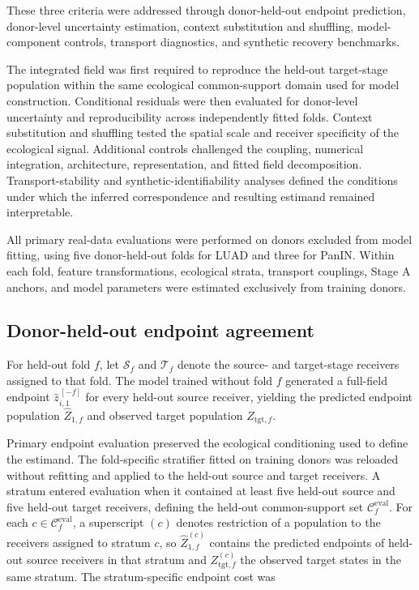 These three criteria were addressed through donor-held-out endpoint
prediction, donor-level uncertainty estimation, context substitution and
shuffling, model-component controls, transport diagnostics, and synthetic
recovery benchmarks.

The integrated field was first required to reproduce the held-out target-stage
population within the same ecological common-support domain used for model
construction. Conditional residuals were then evaluated for donor-level
uncertainty and reproducibility across independently fitted folds. Context
substitution and shuffling tested the spatial scale and receiver specificity of
the ecological signal. Additional controls challenged the coupling, numerical
integration, architecture, representation, and fitted field decomposition.
Transport-stability and synthetic-identifiability analyses defined the
conditions under which the inferred correspondence and resulting estimand
remained interpretable.

All primary real-data evaluations were performed on donors excluded from model
fitting, using five donor-held-out folds for LUAD and three for PanIN. Within
each fold, feature transformations, ecological strata, transport couplings,
Stage A anchors, and model parameters were estimated exclusively from training
donors.

\subsection{Donor-held-out endpoint agreement}
\label{sec:methods-heldout-endpoints}

For held-out fold \(f\), let \(\mathcal{S}_f\) and \(\mathcal{T}_f\) denote
the source- and target-stage receivers assigned to that fold. The model trained
without fold \(f\) generated a full-field endpoint
\(\widehat{z}_{i,1}^{\,[-f]}\) for every held-out source receiver, yielding the
predicted endpoint population \(\widehat{Z}_{1,f}\) and observed target
population \(Z_{\mathrm{tgt},f}\).

Primary endpoint evaluation preserved the ecological conditioning used to
define the estimand. The fold-specific stratifier fitted on training donors was
reloaded without refitting and applied to the held-out source and target
receivers. A stratum entered evaluation when it contained at least five
held-out source and five held-out target receivers, defining the held-out
common-support set \(\mathcal{C}_f^{\mathrm{eval}}\). For each
\(c\in\mathcal{C}_f^{\mathrm{eval}}\), a superscript \((c)\) denotes restriction
of a population to the receivers assigned to stratum \(c\), so
\(\widehat{Z}_{1,f}^{(c)}\) contains the predicted endpoints of held-out source
receivers in that stratum and \(Z_{\mathrm{tgt},f}^{(c)}\) the observed target
states in the same stratum. The stratum-specific endpoint cost was

